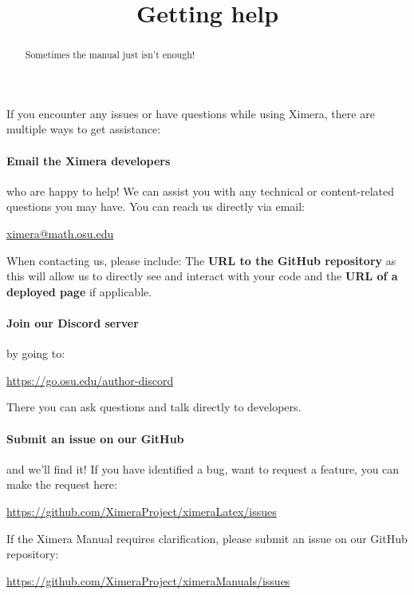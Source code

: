 \documentclass{ximera}
\title{Getting help}
\begin{document}
\begin{abstract}
    Sometimes the manual just isn't enough!
\end{abstract}
\maketitle

If you encounter any issues or have questions while using Ximera, there are
multiple ways to get assistance:

\paragraph{Email the Ximera developers} who are happy to help! We can assist
you with any technical or content-related questions you may have. You can reach
us directly via email:
\begin{center}
    \url{ximera@math.osu.edu}
\end{center}

When contacting us, please include: The \textbf{URL to the GitHub repository}
as this will allow us to directly see and interact with your code and the
\textbf{URL of a deployed page} if applicable.

\paragraph{Join our Discord server} by going to:
\begin{center}
    \url{https://go.osu.edu/author-discord}
\end{center}
There you can ask questions and talk directly to developers.

\paragraph{Submit an issue on our GitHub} and we'll find it!
If you have identified a bug, want to request a feature, you can make the
request here:
\begin{center}
    \url{https://github.com/XimeraProject/ximeraLatex/issues}
\end{center}
If the Ximera Manual requires clarification, please submit an issue on our
GitHub repository:

\begin{center}
    \url{https://github.com/XimeraProject/ximeraManuals/issues}
\end{center}
\end{document}
